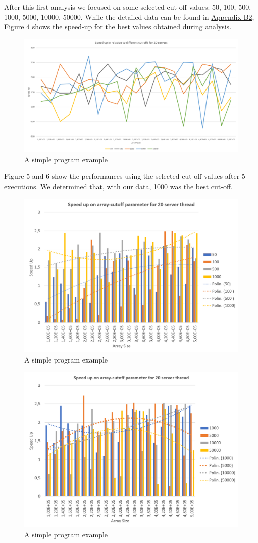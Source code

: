 \documentclass{article}
\begin{document}
	After this first analysis we focused on some selected cut-off values: 50, 100, 500, 1000, 5000, 10000, 50000. 
	While the detailed data can be found in \href{CO2}{Appendix B2}, Figure 4 shows the speed-up for the best values obtained during analysis.
	
	
	\begin{figure}[!h]
		\centering
		\includegraphics[width=0.8\linewidth]{imgs/CutOffs01.png}
		\caption{A simple program example}				
		\label{fig:CO02}
	\end{figure}

	Figure 5 and 6 show the performances using the selected cut-off values after 5 executions. We determined that, with our data, 1000 was the best cut-off.	

	\begin{figure}[!h]
		\centering
		\includegraphics[width=0.8\linewidth]{imgs/hist01.png}
		\caption{A simple program example}				
		\label{fig:CO03}
	\end{figure}

	\begin{figure}[!h]
		\centering
		\includegraphics[width=0.8\linewidth]{imgs/hist02.png}
		\caption{A simple program example}				
		\label{fig:CO04}
	\end{figure}
\end{document}
